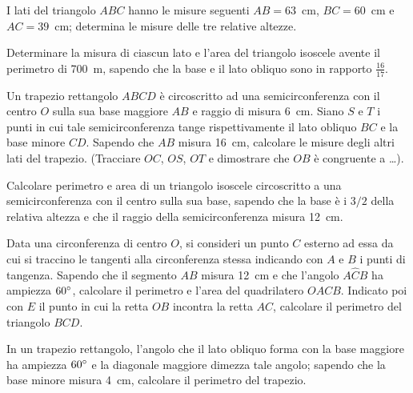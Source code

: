 \begin{multicols}{2}
\begin{esercizio}
\label{ese:7.82}
I lati del triangolo $ABC$ hanno le misure seguenti $AB=63$~cm, $BC=60$~cm e $AC=39$~cm; determina le misure delle tre relative altezze.
\end{esercizio}

\begin{esercizio}
\label{ese:7.83}
Determinare la misura di ciascun lato e l'area del triangolo isoscele avente il perimetro di 700~m, sapendo che la base e il lato obliquo sono in rapporto $\frac{16}{17}$.
\end{esercizio}

\begin{esercizio}
\label{ese:7.84}
Un trapezio rettangolo $ABCD$ è circoscritto ad una semicirconferenza con il centro $O$ sulla sua base maggiore $AB$ e raggio di misura 6~cm. Siano $S$ e $T$ i punti in cui tale semicirconferenza tange rispettivamente il lato obliquo $BC$ e la base minore $CD$. Sapendo che $AB$ misura 16~cm, calcolare le misure degli altri lati del trapezio. (Tracciare $OC$, $OS$, $OT$ e dimostrare che $OB$ è congruente a \ldots{}).
\end{esercizio}

\begin{esercizio}
\label{ese:7.85}
Calcolare perimetro e area di un triangolo isoscele circoscritto a una semicirconferenza con il centro sulla sua base, sapendo che la base è i $3/2$ della relativa altezza e che il raggio della semicirconferenza misura 12~cm.
\end{esercizio}

\begin{esercizio}
\label{ese:7.86}
Data una circonferenza di centro $O$, si consideri un punto $C$ esterno ad essa da cui si traccino le tangenti alla circonferenza stessa indicando con $A$ e $B$ i punti di tangenza. Sapendo che il segmento $AB$ misura 12~cm e che l'angolo $A\widehat{C}B$ ha ampiezza $60{}^{\circ}$, calcolare il perimetro e l'area del quadrilatero $OACB$. Indicato poi con $E$ il punto in cui la retta $OB$ incontra la retta $AC$, calcolare il perimetro del triangolo $BCD$.
\end{esercizio}

\begin{esercizio}
\label{ese:7.87}
In un trapezio rettangolo, l'angolo che il lato obliquo forma con la base maggiore ha ampiezza $60{}^{\circ}$ e la diagonale maggiore dimezza tale angolo; sapendo che la base minore misura 4~cm,  calcolare il perimetro del trapezio.
\end{esercizio}


\end{multicols}
